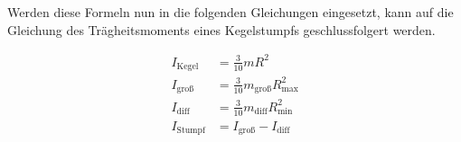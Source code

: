 Werden diese Formeln nun in die folgenden Gleichungen eingesetzt, kann auf die Gleichung des Trägheitsmoments eines 
Kegelstumpfs geschlussfolgert werden. 

\begin{align}
    I_\text{Kegel}&=\frac{3}{10}mR^2 \\
    I_\text{groß}&=\frac{3}{10}m_\text{groß}R_\text{max}^2 \\
    I_\text{diff}&=\frac{3}{10}m_\text{diff}R_\text{min}^2 \\
    I_\text{Stumpf}&=I_\text{groß}-I_\text{diff}
\end{align}